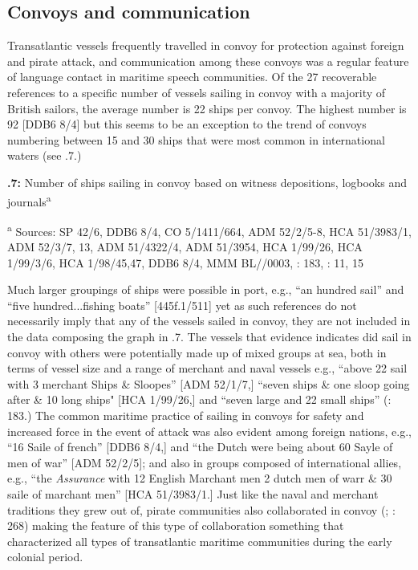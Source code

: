 \subsection{\textbf{Convoys} \textbf{and} \textbf{communication}}%

Transatlantic vessels frequently travelled in convoy for protection against foreign and pirate attack, and communication among these convoys was a regular feature of language contact in maritime speech communities. Of the 27 recoverable references to a specific number of vessels sailing in convoy with a majority of British sailors, the average number is 22 ships per convoy. The highest number is 92 [DDB6 8/4] but this seems to be an exception to the trend of convoys numbering between 15 and 30 ships that were most common in international waters (see .7.) 

  
 

\textbf{.7:} Number of ships sailing in convoy based on witness depositions, logbooks and journals\textsuperscript{a}

\textsuperscript{a} Sources: SP 42/6, DDB6 8/4, CO 5/1411/664, ADM 52/2/5-8, HCA 51/3983/1, ADM 52/3/7, 13, ADM 51/4322/4, ADM 51/3954, HCA 1/99/26, HCA 1/99/3/6, HCA 1/98/45,47, DDB6 8/4, MMM BL/\citealt{Egerton2395}/0003, \citealt{Bicheno2012}: 183, \citealt{Gage1648}: 11, 15

Much larger groupings of ships were possible in port, e.g., “an hundred sail” and “five hundred...fishing boats” [445f.1/511] yet as such references do not necessarily imply that any of the vessels sailed in convoy, they are not included in the data composing the graph in .7. The vessels that evidence indicates did sail in convoy with others were potentially made up of mixed groups at sea, both in terms of vessel size and a range of merchant and naval vessels e.g., “above 22 sail with 3 merchant Ships \& Sloopes” [ADM 52/1/7,] “seven ships \& one sloop going after \& 10 long ships" [HCA 1/99/26,] and “seven large and 22 small ships” (\citealt{Bicheno2012}: 183.) The common maritime practice of sailing in convoys for safety and increased force in the event of attack was also evident among foreign nations, e.g., “16 Saile of french” [DDB6 8/4,] and “the Dutch were being about 60 Sayle of men of war” [ADM 52/2/5]; and also in groups composed of international allies, e.g., “the \textit{Assurance} with 12 English Marchant men 2 dutch men of warr \& 30 saile of marchant men” [HCA 51/3983/1.] Just like the naval and merchant traditions they grew out of, pirate communities also collaborated in convoy (\citealt{Esquemelin1678}; \citealt{Rediker1987}: 268) making the feature of this type of collaboration something that characterized all types of transatlantic maritime communities during the early colonial period. 

